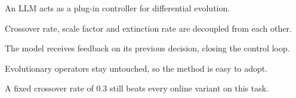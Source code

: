 %

An LLM acts as a plug-in controller for differential evolution.

Crossover rate, scale factor and extinction rate are decoupled from each other.

The model receives feedback on its previous decision, closing the control loop.

Evolutionary operators stay untouched, so the method is easy to adopt.

A fixed crossover rate of 0.3 still beats every online variant on this task.
